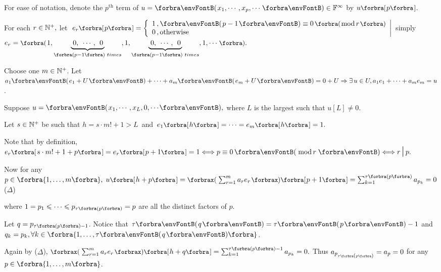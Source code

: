 For ease of notation, denote the $p^\text{th}$ term of $u=\Par{x_1,\cdots,x_p,\cdots}\in\Fbb^{\infty}$ by $u\Sbra{p}$.\vspace{6pt}\par\quad
For each $r\in{\mathbb{N}^+},$ let $\;e_r\Sbra{p}=\hMath[0pt]{l}{\left\{}{\right|}{1\,,\Par{p-1}\equiv 0\,\BigPar{\text{mod}\,r}\\0\,,\text{otherwise}}$ \;\;simply $e_r=\BigPar{1,\underbrace{\;0,\;\,\cdots,\;\,0\,}_{\SmallPar{p-1}\,\,times},1,\underbrace{\;0,\;\,\cdots,\;\,0\,}_{\SmallPar{p-1}\,\,times},1,\cdots}.$\vspace{6pt}\par\quad
Choose one $m\in{\mathbb{N}^+}$. Let $a_1\Par{e_1+U}+\dots+a_m\Par{e_m+U}=0+U\Rightarrow\exists\,u\in U,a_1 e_1+\dots+a_m e_m=u$.\vspace{4pt}\par\quad
Suppose $u=\Par{x_1,\cdots,x_L,{0,\cdots}},$ where $L$ is the largest such that $u[L]\neq 0.$\vspace{4pt}\par\quad
Let $s\in{\mathbb{N}^+}$ be such that $h=s\cdot m!+1> L$\, and \,$e_1\Sbra{h}=\cdots=e_m\Sbra{h}=1.$\vspace{6pt}\par\quad
Note that by definition, \;$e_r\Sbra{s\cdot m!+1+p}=e_r\Sbra{p+1}=1\Longleftrightarrow p\equiv 0\,\Par{\,\text{mod}\,r\,}\Longleftrightarrow r\,\mmid\,p.$\vspace{6pt}\par\quad
Now for any $p\in\Bra{1,\dots,m},\;u\Sbra{h+p}=\XPar{\sum_{r=1}^m a_r e_r}\Sbra{p+1}=\sum_{k=1}^{\tau\SmallPar{p}}a_{p_k}=0$\hfill(${\Delta}$)\vspace{6pt}\par\quad
where $1=p_1\leqslant\cdots\leqslant p_{\tau\SmallPar{p}}=p$ are all the distinct factors of $p.$\vspace{4pt}\par\quad
Let $q=p_{\tau\SmallPar{p}-1}$. Notice that $\tau\Par{q}=\tau\Par{p}-1$ and $q_k=p_k,\forall k\in\Bra{1,\dots,\tau\Par{q}}$.\par\vspace{6pt}\quad
Again by ($\Delta$), $\XPar{\sum_{r=1}^m a_r e_r}\Sbra{h+q}=\sum_{k=1}^{\tau\SmallPar{p}-1}a_{p_k}=0.$ Thus $a_{p_{\tau\SmallPar{p}}}=a_p=0$ for any $p\in\Bra{1,\dots,m}$.\vspace{8pt}\par\quad
